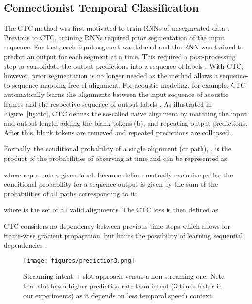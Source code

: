 \documentclass[a4paper]{article}
\begin{document}
\subsection{Connectionist Temporal Classification}
\label{subsec:ctc}


The CTC method was first motivated to train RNNs of unsegmented data \cite{graves2006connectionist}. Previous to CTC, training RNNs required prior segmentation of the input sequence. For that, each input segment was labeled and the RNN was trained to predict an output for each segment at a time. This required a post-processing step to consolidate the output predictions into a sequence of labels \cite{graves2006connectionist}. With CTC, however, prior segmentation is no longer needed as the method allows a sequence-to-sequence mapping free of alignment. For acoustic modeling, for example, CTC automatically learns the alignments between the input sequence of acoustic frames and the respective sequence of output labels \cite{miao2016empirical}. As illustrated in Figure~\ref{fig:ctc}, CTC defines the so-called naive alignment by matching the input and output length adding the blank tokens (b), and repeating output predictions. After this, blank tokens are removed and repeated predictions are collapsed. 

Formally, the conditional probability of a single alignment (or path), , is the product of the probabilities of observing  at time  and can be represented as



\noindent where  represents a given label. Because  defines mutually exclusive paths, the conditional probability for a sequence output is given by the sum of the probabilities of all paths corresponding to it: 


\noindent where  is the set of all valid alignments. The CTC loss is then defined as 



CTC considers no dependency between previous time steps which allows for frame-wise gradient propagation, but limits the possibility of learning sequential dependencies \cite{kamath2019deep}.

















\begin{figure}
\centering
  \texttt{[image: figures/prediction3.png]}
  \caption{Streaming intent + slot approach versus a non-streaming one. Note that slot has a higher prediction rate than intent (3 times faster in our experiments) as it depends on less temporal speech context.}
  \label{fig:prediction}
\end{figure}
\end{document}
